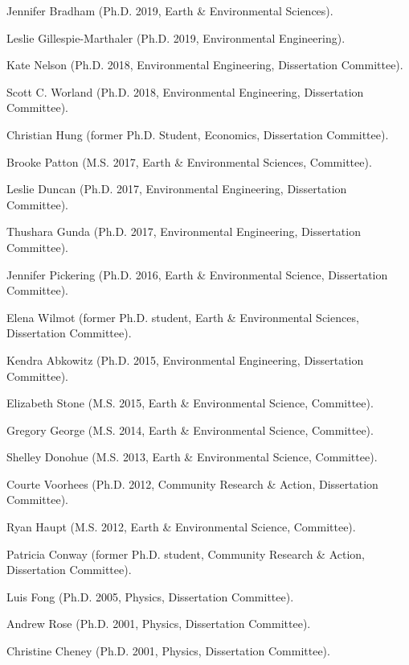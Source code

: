 \item Jennifer Bradham (Ph.D. 2019, Earth \& Environmental Sciences).
\item Leslie Gillespie-Marthaler (Ph.D. 2019, Environmental Engineering).
\item Kate Nelson (Ph.D. 2018, Environmental Engineering, Dissertation Committee).
\item Scott C. Worland (Ph.D. 2018, Environmental Engineering, Dissertation Committee).
\item Christian Hung (former Ph.D. Student, Economics, Dissertation Committee).
\item Brooke Patton (M.S. 2017, Earth \& Environmental Sciences, Committee).
\item Leslie Duncan (Ph.D. 2017, Environmental Engineering, Dissertation Committee).
\item Thushara Gunda (Ph.D. 2017, Environmental Engineering, Dissertation Committee).
\item Jennifer Pickering (Ph.D. 2016, Earth \& Environmental Science, Dissertation Committee).
\item Elena Wilmot (former Ph.D. student, Earth \& Environmental Sciences, Dissertation Committee).
\item Kendra Abkowitz (Ph.D. 2015, Environmental Engineering, Dissertation Committee).
\item Elizabeth Stone (M.S. 2015, Earth \& Environmental Science, Committee).
\item Gregory George (M.S. 2014, Earth \& Environmental Science, Committee).
\item Shelley Donohue (M.S. 2013, Earth \& Environmental Science, Committee).
\item Courte Voorhees (Ph.D. 2012,  Community Research \& Action, Dissertation Committee).
\item Ryan Haupt (M.S. 2012, Earth \& Environmental Science, Committee).
\item Patricia Conway (former Ph.D. student, Community Research \& Action, Dissertation Committee).
\item Luis Fong (Ph.D. 2005, Physics, Dissertation Committee).
\item Andrew Rose (Ph.D. 2001, Physics, Dissertation Committee).
\item Christine Cheney (Ph.D. 2001, Physics, Dissertation Committee).
